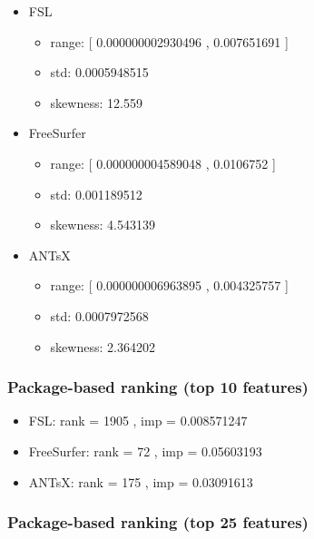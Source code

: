 \documentclass[
  10pt,
]{article}
\begin{document}
\begin{itemize}
\item
  FSL

  \begin{itemize}
  \item
    range: {[} 0.000000002930496 , 0.007651691 {]}
  \item
    std: 0.0005948515
  \item
    skewness: 12.559
  \end{itemize}
\item
  FreeSurfer

  \begin{itemize}
  \item
    range: {[} 0.000000004589048 , 0.0106752 {]}
  \item
    std: 0.001189512
  \item
    skewness: 4.543139
  \end{itemize}
\item
  ANTsX

  \begin{itemize}
  \item
    range: {[} 0.000000006963895 , 0.004325757 {]}
  \item
    std: 0.0007972568
  \item
    skewness: 2.364202
  \end{itemize}
\end{itemize}

\hypertarget{package-based-ranking-top-10-features-3}{%
\subsubsection{Package-based ranking (top 10
features)}\label{package-based-ranking-top-10-features-3}}

\begin{itemize}
\item
  FSL: rank = 1905 , imp = 0.008571247
\item
  FreeSurfer: rank = 72 , imp = 0.05603193
\item
  ANTsX: rank = 175 , imp = 0.03091613
\end{itemize}

\hypertarget{package-based-ranking-top-25-features-3}{%
\subsubsection{Package-based ranking (top 25
features)}\label{package-based-ranking-top-25-features-3}}
\end{document}

